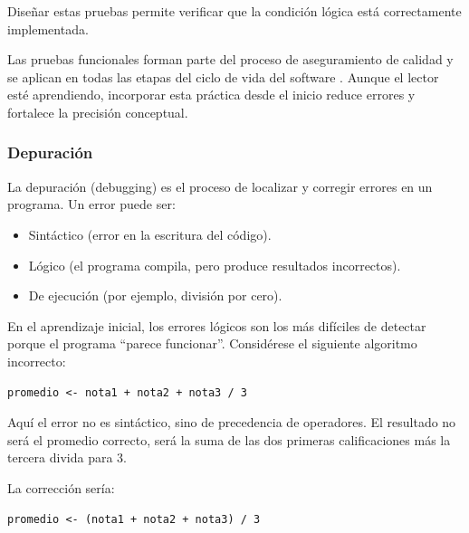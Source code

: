 \documentclass[12pt,twoside]{book}
\begin{document}
						\noindent
						Diseñar estas pruebas permite verificar que la condición lógica está correctamente implementada.
						
						Las pruebas funcionales forman parte del proceso de aseguramiento de calidad y se aplican en todas las etapas del ciclo de vida del software \cite{SWEBOK2025Guide}. Aunque el lector esté aprendiendo, incorporar esta práctica desde el inicio reduce errores y fortalece la precisión conceptual.
						
					\subsubsection{Depuración}
						\noindent
						La depuración (debugging) es el proceso de localizar y corregir errores en un programa. Un error puede ser:
						
						\begin{itemize}
							\item Sintáctico (error en la escritura del código).
							\item Lógico (el programa compila, pero produce resultados incorrectos).
							\item De ejecución (por ejemplo, división por cero).
						\end{itemize}
						
						\noindent
						En el aprendizaje inicial, los errores lógicos son los más difíciles de detectar porque el programa “parece funcionar”. Considérese el siguiente algoritmo incorrecto:
						
						\begin{lstlisting}[style=upsamStyle, caption={Ejemplo con error lógico en cálculo de promedio.}, label={lst:ErrorLogicoPromedio}, basicstyle=\small\ttfamily]
	promedio <- nota1 + nota2 + nota3 / 3 \end{lstlisting}
						
						\noindent
						Aquí el error no es sintáctico, sino de precedencia de operadores. El resultado no será el promedio correcto, será la suma de las dos primeras calificaciones más la tercera divida para 3.
						
						La corrección sería:
						
						\begin{lstlisting}[style=upsamStyle, caption={Corrección del cálculo de promedio.},
							label={lst:CorreccionPromedio}, basicstyle=\small\ttfamily]
	promedio <- (nota1 + nota2 + nota3) / 3 \end{lstlisting}
						
\end{document}
